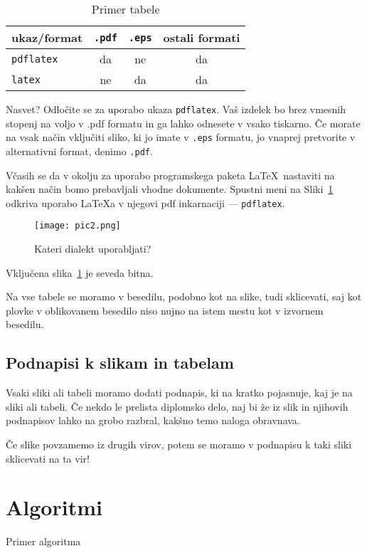 \documentclass{feridiploma}
\begin{document}
	\begin{table}
		\caption{Primer tabele}
		\label{tbl:1}
		\centering
		\begin{tabular}{l|ccc}
			ukaz/format & {\tt .pdf} & {\tt .eps} & ostali formati \\ \hline
			{\tt pdflatex} & da & ne & da \\
			{\tt latex}   & ne & da  & da
		\end{tabular}
	\end{table}
	
	Nasvet? 
	Odločite se za uporabo ukaza {\tt pdflatex}. Vaš izdelek bo brez vmesnih stopenj na voljo v {.pdf} formatu in ga lahko odnesete v vsako tiskarno. 
	Če morate na vsak način vključiti sliko, ki jo imate v {\tt .eps} formatu, jo vnaprej pretvorite v alternativni format, denimo {\tt .pdf}.
	
	Včasih se da v okolju za uporabo programskega paketa \LaTeX\ nastaviti na kakšen način bomo prebavljali vhodne dokumente. 
	Spustni meni na Sliki~\ref{pic2} odkriva uporabo \LaTeX{}a v njegovi pdf inkarnaciji --- {\tt pdflatex}.
	\begin{figure}[t]
	\begin{center}
	\texttt{[image: pic2.png]}
	\end{center}
	\caption{Kateri dialekt uporabljati?}
	\label{pic2}
	\end{figure}
	Vključena slika~\ref{pic2} je seveda bitna.
	
	Na vse tabele se moramo v besedilu, podobno kot na slike, tudi sklicevati, saj kot plovke v oblikovanem besedilo niso nujno na istem mestu kot v izvornem besedilu.
	
	\subsection{Podnapisi k slikam in tabelam}
	
	Vsaki sliki ali tabeli moramo dodati podnapis, ki na kratko pojasnuje, kaj je na sliki ali tabeli. 
	Če nekdo le prelista diplomsko delo, naj bi že iz slik in njihovih podnapisov lahko na grobo razbral, kakšno temo naloga obravnava.
	
	Če slike povzamemo iz drugih virov, potem se moramo v podnapisu k taki sliki sklicevati na ta vir!
	
	\section{Algoritmi}
	Primer algoritma
	
\end{document}
